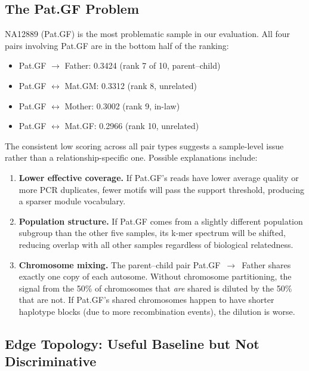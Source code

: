 \documentclass{../yalumba}
\begin{document}
\subsection{The Pat.GF Problem}

NA12889 (Pat.GF) is the most problematic sample in our evaluation.  All four
pairs involving Pat.GF are in the bottom half of the ranking:

\begin{itemize}
  \item Pat.GF $\to$ Father: 0.3424 (rank 7 of 10, parent--child)
  \item Pat.GF $\leftrightarrow$ Mat.GM: 0.3312 (rank 8, unrelated)
  \item Pat.GF $\leftrightarrow$ Mother: 0.3002 (rank 9, in-law)
  \item Pat.GF $\leftrightarrow$ Mat.GF: 0.2966 (rank 10, unrelated)
\end{itemize}

The consistent low scoring across all pair types suggests a sample-level
issue rather than a relationship-specific one.  Possible explanations include:

\begin{enumerate}
  \item \textbf{Lower effective coverage.}  If Pat.GF's reads have lower
        average quality or more PCR duplicates, fewer motifs will pass the
        support threshold, producing a sparser module vocabulary.

  \item \textbf{Population structure.}  If Pat.GF comes from a slightly
        different population subgroup than the other five samples, its k-mer
        spectrum will be shifted, reducing overlap with all other samples
        regardless of biological relatedness.

  \item \textbf{Chromosome mixing.}  The parent--child pair Pat.GF~$\to$~Father
        shares exactly one copy of each autosome.  Without chromosome
        partitioning, the signal from the 50\% of chromosomes that \emph{are}
        shared is diluted by the 50\% that are not.  If Pat.GF's shared
        chromosomes happen to have shorter haplotype blocks (due to more
        recombination events), the dilution is worse.
\end{enumerate}

\subsection{Edge Topology: Useful Baseline but Not Discriminative}
\end{document}
